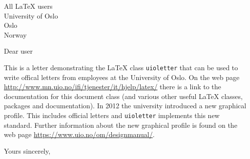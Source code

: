 \documentclass[UKenglish]{uioletter}
\date{Mid July 2010}
\begin{document}
\begin{letter}{All \LaTeX{} users\\ University of Oslo\\ Oslo\\ Norway}

    \opening{Dear user}
    This is a letter demonstrating the \LaTeX{} class \texttt{uioletter}
    that can be used to write offical letters from employees at the University of Oslo.
    On the web page
    \url{http://www.mn.uio.no/ifi/tjenester/it/hjelp/latex/}
    there is a link to the documentation for this document class
    (and various other useful \LaTeX{} classes, packages and documentation).
    In 2012 the university introduced a new graphical profile.
    This includes official letters
    and \texttt{uioletter} implements this new standard.
    Further information about the new graphical profile is found on the web page
    \url{https://www.uio.no/om/designmanual/}.

    \closing{Yours sincerely,}
\end{letter}
\end{document}
